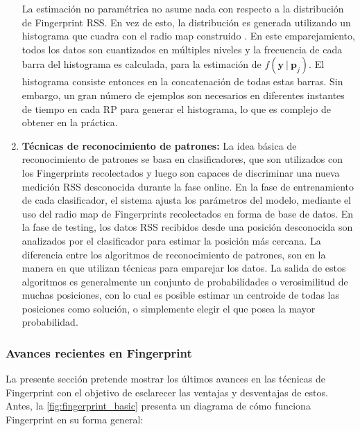 \begin{enumerate}
La estimación no paramétrica no asume nada con respecto a la distribución de Fingerprint RSS. En vez de esto, la distribución es generada utilizando un histograma que cuadra con el radio map construido \citep{Haeberlen:2004:PRL:1023720.1023728, Ladd:2002:RLS:570645.570674}. En este emparejamiento, todos los datos son cuantizados en múltiples niveles y la frecuencia de cada barra del histograma es calculada, para la estimación de \(f( \textbf{y} \ \vert \ \textbf{p}_{j} ) \). El histograma consiste entonces en la concatenación de todas estas barras. Sin embargo, un gran número de ejemplos son necesarios en diferentes instantes de tiempo en cada RP para generar el histograma, lo que es complejo de obtener en la práctica.

\item \textbf{Técnicas de reconocimiento de patrones:} La idea básica de reconocimiento de patrones se basa en clasificadores, que son utilizados con los Fingerprints recolectados y luego son capaces de discriminar una nueva medición RSS desconocida durante la fase online. En la fase de entrenamiento de cada clasificador, el sistema ajusta los parámetros del modelo, mediante el uso del radio map de Fingerprints recolectados en forma de base de datos. En la fase de testing, los datos RSS recibidos desde una posición desconocida son analizados por el clasificador para estimar la posición más cercana. La diferencia entre los algoritmos de reconocimiento de patrones, son en la manera en que utilizan técnicas para emparejar los datos. La salida de estos algoritmos es generalmente un conjunto de probabilidades o verosimilitud de muchas posiciones, con lo cual es posible estimar un centroide de todas las posiciones como solución, o simplemente elegir el que posea la mayor probabilidad.
\end{enumerate}

\subsubsection{Avances recientes en Fingerprint}

La presente sección pretende mostrar los últimos avances en las técnicas de Fingerprint con el objetivo de esclarecer las ventajas y desventajas de estos. Antes, la \autoref{fig:fingerprint_basic} presenta un diagrama de cómo funciona Fingerprint en su forma general:

